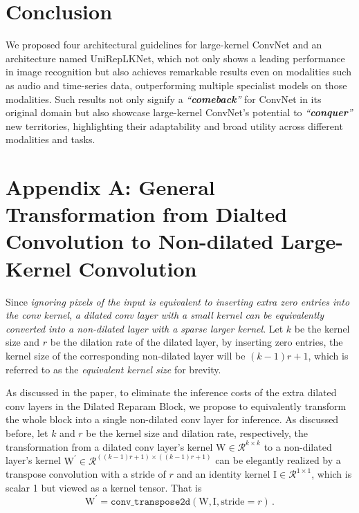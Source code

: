 \documentclass[10pt,twocolumn,letterpaper]{article}
\begin{document}
 \section{Conclusion}
We proposed four architectural guidelines for large-kernel ConvNet and an architecture named UniRepLKNet, which not only shows a leading performance in image recognition but also achieves remarkable results even on modalities such as audio and time-series data, outperforming multiple specialist models on those modalities. Such results not only signify a \emph{``\textbf{comeback}''} for ConvNet in its original domain but also showcase large-kernel ConvNet's potential to \emph{``\textbf{conquer}''} new territories, highlighting their adaptability and broad utility across different modalities and tasks. 
{
    \small
    
    
}

\newpage



\clearpage
\setcounter{page}{1}
\maketitlesupplementary


\section*{Appendix A: General Transformation from Dialted Convolution to Non-dilated Large-Kernel Convolution}

Since \emph{ignoring pixels of the input is equivalent to inserting extra zero entries into the conv kernel}, \emph{a dilated conv layer with a small kernel can be equivalently converted into a non-dilated layer with a sparse larger kernel}. Let $k$ be the kernel size and $r$ be the dilation rate of the dilated layer, by inserting zero entries, the kernel size of the corresponding non-dilated layer will be $(k-1)r+1$, which is referred to as the \emph{equivalent kernel size} for brevity. 

As discussed in the paper, to eliminate the inference costs of the extra dilated conv layers in the Dilated Reparam Block, we propose to equivalently transform the whole block into a single non-dilated conv layer for inference. As discussed before, let $k$ and $r$ be the kernel size and dilation rate, respectively, the transformation from a dilated conv layer's kernel $\mathrm{W}\in\mathcal{R}^{k\times k}$ to a non-dilated layer's kernel $\mathrm{W}^\prime\in\mathcal{R}^{((k-1)r+1)\times ((k-1)r+1)}$ can be elegantly realized by a transpose convolution with a stride of $r$ and an identity kernel $\mathrm{I}\in\mathcal{R}^{1\times1}$, which is scalar 1 but viewed as a kernel tensor. That is
\begin{equation}\label{eq-merge_supp}
    \mathrm{W}^\prime = \mathtt{conv\_transpose2d}(\mathrm{W}, \mathrm{I}, \text{stride}=r) \,.
\end{equation}
\end{document}
